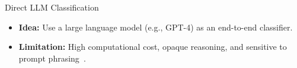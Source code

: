 \documentclass[aspectratio=169,10pt]{beamer}
\begin{document}
\begin{frame}
\begin{columns}[T]
\begin{column}{0.45\textwidth}
            \begin{block}{Direct LLM Classification}
                 \begin{itemize}
                    \item \textbf{Idea:} Use a large language model (e.g., GPT-4) as an end-to-end classifier.
                    \item \textbf{Limitation:} High computational cost, opaque reasoning, and sensitive to prompt phrasing~\cite{Errica2024WhatDI}.
                \end{itemize}
            \end{block}
        \end{column}
    \end{columns}
    
    
\end{frame}
\end{document}
